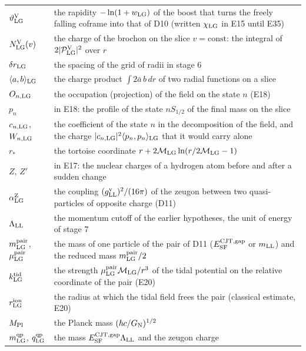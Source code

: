 \documentclass[
  10pt,
]{article}
\begin{document}
\begin{longtable}[]{@{}
  >{\raggedright\arraybackslash}p{}
  >{\raggedright\arraybackslash}p{}@{}}
\(\vartheta^{\rm V}_{\rm LG}\) & the rapidity \(-\ln(1+w_{\rm LG})\) of
the boost that turns the freely falling coframe into that of D10
(written \(\chi_{\rm LG}\) in E15 until E35) \\
\(N^{\rm V}_{\rm LG}(v)\) & the charge of the brochon on the slice
\(v=\text{const}\): the integral of
\(2\lvert\mathcal P^{\rm V}_{\rm LG}\rvert^2\) over \(r\) \\
\(\delta r_{\rm LG}\) & the spacing of the grid of radii in stage 6 \\
\(\langle a,b\rangle_{\rm LG}\) & the charge product
\(\int2\bar a\,b\,dr\) of two radial functions on a slice \\
\(O_{n,{\rm LG}}\) & the occupation (projection) of the field on the
state \(n\) (E18) \\
\(p_n\) & in E18: the profile of the state \(nS_{1/2}\) of the final
mass on the slice \\
\(c_{n,{\rm LG}}\), \(W_{n,{\rm LG}}\) & the coefficient of the state
\(n\) in the decomposition of the field, and the charge
\(\lvert c_{n,{\rm LG}}\rvert^2\langle p_n,p_n\rangle_{\rm LG}\) that it
would carry alone \\
\(r_*\) & the tortoise coordinate
\(r+2\mathcal M_{\rm LG}\ln(r/2\mathcal M_{\rm LG}-1)\) \\
\(Z\), \(Z'\) & in E17: the nuclear charges of a hydrogen atom before
and after a sudden change \\
\(\alpha^{\rm Z}_{\rm LG}\) & the coupling
\((g^{\rm v}_{\rm LL})^2/(16\pi)\) of the zeugon between two
quasi-particles of opposite charge (D11) \\
\(\Lambda_{\rm LL}\) & the momentum cutoff of the earlier hypotheses,
the unit of energy of stage 7 \\
\(m^{\rm pair}_{\rm LG}\), \(\mu^{\rm pair}_{\rm LG}\) & the mass of one
particle of the pair of D11 (\(E^{\rm CJT,gap}_{\rm SF}\) or
\(m_{\rm LL}\)) and the reduced mass \(m^{\rm pair}_{\rm LG}/2\) \\
\(k^{\rm tid}_{\rm LG}\) & the strength
\(\mu^{\rm pair}_{\rm LG}\mathcal M_{\rm LG}/r^3\) of the tidal
potential on the relative coordinate of the pair (E20) \\
\(r^{\rm ion}_{\rm LG}\) & the radius at which the tidal field frees the
pair (classical estimate, E20) \\
\(M_{\rm Pl}\) & the Planck mass \((\hbar c/G_{\rm N})^{1/2}\) \\
\(m^{\rm qp}_{\rm LG}\), \(q^{\rm qp}_{\rm LG}\) & the mass
\(E^{\rm CJT,gap}_{\rm SF}\Lambda_{\rm LL}\) and the zeugon charge

\end{longtable}
\end{document}
